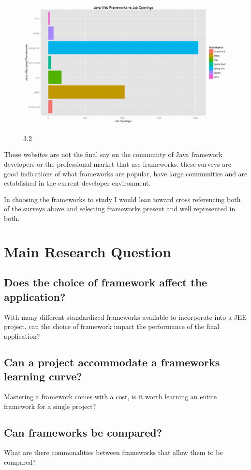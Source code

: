 \begin{figure}[h]
	\includegraphics[width=.7\textwidth]{img22.png}
	\begin{center}
		\figurename{ 3.2}
	\end{center}
\end{figure}

\newpage

These websites are not the final say on the community of Java framework developers or the professional market that use frameworks. these surveys are good indications of what frameworks are popular, have large communities and are established in the current developer environment.

In choosing the frameworks to study I would lean toward cross referencing both of the surveys above and selecting frameworks present and well represented in both. 

\section{Main Research Question}
\subsection{Does the choice of framework affect the application?}
With many different standardized frameworks available to incorporate into a JEE project, can the choice of framework impact the performance of the final application? 
\subsection{Can a project accommodate a frameworks learning curve?}
Mastering a framework comes with a cost, is it worth learning an entire framework for a single project?
\subsection{Can frameworks be compared?}
What are there commonalities between frameworks that allow them to be compared?
